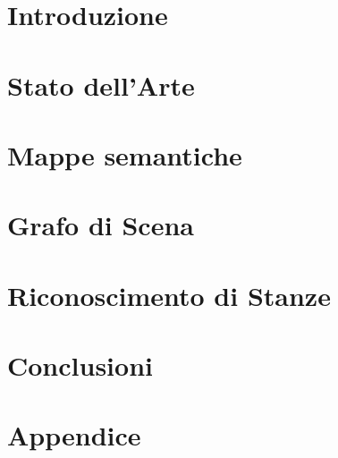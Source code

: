 \documentclass[a4paper, oneside]{book}
\author{Luca Brini}
\begin{document}


\tableofcontents

\chapter*{Introduzione}



\chapter*{Stato dell'Arte}


\chapter{Mappe semantiche}



\chapter{Grafo di Scena}\label{chap:grafo_di_scena}



\chapter{Riconoscimento di Stanze}\label{chap:riconoscimento_stanze}



\chapter{Conclusioni}



\appendix
\chapter{Appendice}




\printnoidxglossaries

\printbibliography
\end{document}
